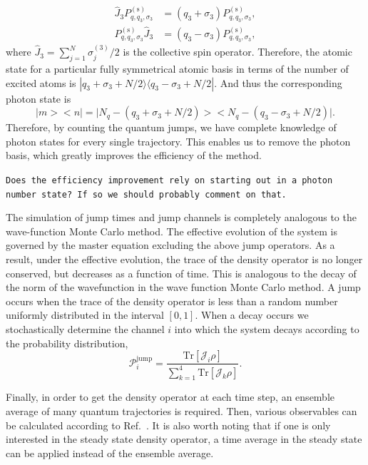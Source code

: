 \documentclass[aps,
twocolumn,
superscriptaddress,groupedaddress]{revtex4}
\newcommand{\dmcomment}[1]{{\tt #1}}
\begin{document}
\begin{equation}
\begin{split}
  \hat{J}_3P_{q,q_3,\sigma_3}^{(\mathrm{s})}&=
  (q_3+\sigma_3)P_{q,q_3,\sigma_3}^{(\mathrm{s})},\\
  P_{q,q_3,\sigma_3}^{(\mathrm{s})}\hat{J}_3&=
  (q_3-\sigma_3)P_{q,q_3,\sigma_3}^{(\mathrm{s})},
\end{split}
\end{equation}
where $\hat{J}_3=\sum_{j=1}^N\sigma_j^{(3)}/2$ is the collective spin
operator. Therefore, the atomic state for a particular fully symmetrical
atomic basis in terms of the number of excited atoms is
$|q_3+\sigma_3+N/2\rangle\langle q_3-\sigma_3+N/2|$. And thus the
corresponding photon state is
\begin{equation}
\bigl|m\bigr>\bigl<n\bigr|=
\bigl|N_q-(q_3+\sigma_3+N/2)\bigr>
\bigl<N_q-(q_3-\sigma_3+N/2)\bigr|.
\end{equation}
Therefore, by counting the quantum jumps, we have complete knowledge of
photon states for every single trajectory. This enables us to remove the
photon basis, which greatly improves the efficiency of the method.

\dmcomment{Does the efficiency improvement rely on starting out in
a photon number state? If so we should probably comment on that.}

The simulation of jump times and jump channels is completely analogous
to the wave-function Monte Carlo method. The effective evolution of the
system is governed by the master equation excluding the above jump
operators. As a result, under the effective evolution, the trace of the
density operator is no longer conserved, but decreases as a function of
time.  This is analogous to the decay of the norm of the wavefunction in
the wave function Monte Carlo method. A jump occurs when the trace of
the density operator is less than a random number uniformly distributed
in the interval $[0,1]$. When a decay occurs we stochastically determine
the channel $i$ into which the system decays according to the
probability distribution,
\begin{equation}
\mathcal{P}_i^{\mathrm{jump}}=\frac{\mathrm{Tr}[\mathcal{J}_i\rho]}{\sum_{k=1}^4
\mathrm{Tr}[\mathcal{J}_k\rho]}.
\end{equation}

Finally, in order to get the density operator at each time step, an
ensemble average of many quantum trajectories is required. Then, various
observables can be calculated according to Ref.~\cite{Holland13}. It is
also worth noting that if one is only interested in the steady state
density operator, a time average in the steady state can be applied
instead of the ensemble average.
\end{document}
